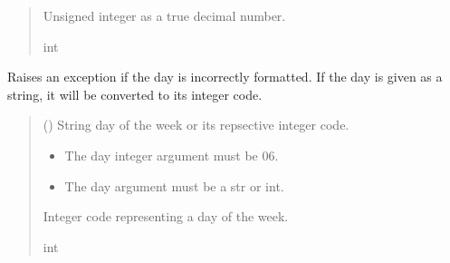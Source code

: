 \documentclass[letterpaper,10pt,english]{sphinxmanual}
\begin{document}
\begin{fulllineitems}
\begin{fulllineitems}
\begin{quote}
\begin{description}
\sphinxAtStartPar
Unsigned integer as a true decimal number.

\sphinxAtStartPar
int

\end{description}\end{quote}

\end{fulllineitems}


\begin{fulllineitems}
\label{\detokenize{Morelia.Devices:Morelia.Devices.PodDevice_8229.Pod8229._Validate_Day}}
\pysigstartsignatures
{}
\pysigstopsignatures
\sphinxAtStartPar
Raises an exception if the day is incorrectly formatted. If the day is given as         a string, it will be converted to its integer code.
\begin{quote}\begin{description}
\sphinxAtStartPar
{} (\sphinxstyleliteralemphasis{\sphinxupquote{ | }}) \textendash{} String day of the week or its repsective integer code.

\begin{itemize}
\item {} 
\sphinxAtStartPar
{} \textendash{} The day integer argument must be 0\sphinxhyphen{}6.

\item {} 
\sphinxAtStartPar
{} \textendash{} The day argument must be a str or int.

\end{itemize}

\sphinxAtStartPar
Integer code representing a day of the week.

\sphinxAtStartPar
int


\end{description}
\end{quote}
\end{fulllineitems}
\end{fulllineitems}
\end{document}
